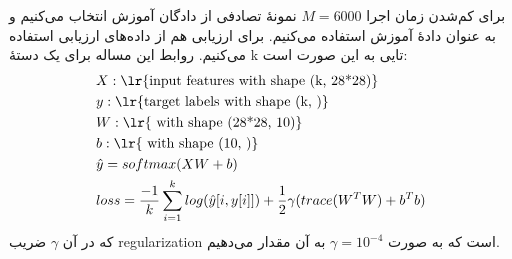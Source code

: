 \documentclass[11pt,a4paper]{article}
\begin{document}
 برای کم‌شدن زمان اجرا 
$M=6000$
  نمونهٔ تصادفی از دادگان آموزش انتخاب می‌کنیم و به عنوان دادهٔ آموزش استفاده می‌کنیم. برای ارزیابی هم از داده‌های ارزیابی استفاده می‌کنیم. روابط این مساله برای یک دستهٔ k تایی به این صورت است:
\begin{align*}
&X: \text{\lr{input features with shape (k, 28*28)}}\\
&y: \text{\lr{target labels with shape (k, )}}\\
&W: \text{\lr{ with shape (28*28, 10)}}\\
&b: \text{\lr{ with shape (10, )}}\\
&\hat{y} = softmax(XW + b)\\
&loss = \frac{-1}{k} \sum_{i = 1}^{k}log(\hat{y}[i, y[i]]) + \frac{1}{2}\gamma (trace(W^TW) + b^Tb)
\end{align*}
که در آن $\gamma$ ضریب regularization است که به صورت
$\gamma = 10^{-4}$
به آن مقدار می‌دهیم.
\end{document}
